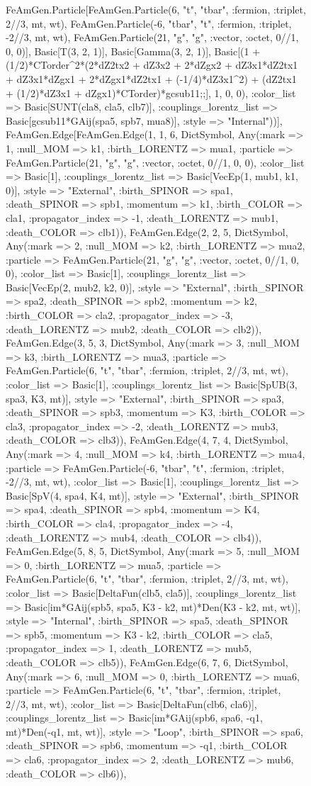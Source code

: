 \documentclass{revtex4}
\begin{document}
\begin{figure}[!htb]
\begin{center}
{FeAmGen.Particle[FeAmGen.Particle(6, "t", "tbar", :fermion, :triplet, 2//3, mt, wt), FeAmGen.Particle(-6, "tbar", "t", :fermion, :triplet, -2//3, mt, wt), FeAmGen.Particle(21, "g", "g", :vector, :octet, 0//1, 0, 0)], Basic[T(3, 2, 1)], Basic[Gamma(3, 2, 1)], Basic[(1 + (1/2)*CTorder^2*(2*dZ2tx2 + dZ3x2 + 2*dZgx2 + dZ3x1*dZ2tx1 + dZ3x1*dZgx1 + 2*dZgx1*dZ2tx1 + (-1/4)*dZ3x1^2) + (dZ2tx1 + (1/2)*dZ3x1 + dZgx1)*CTorder)*gcsub11;;], 1, 0, 0), :color_list => Basic[SUNT(cla8, cla5, clb7)], :couplings_lorentz_list => Basic[gcsub11*GAij(spa5, spb7, mua8)], :style => "Internal"))], FeAmGen.Edge[FeAmGen.Edge(1, 1, 6, Dict{Symbol, Any}(:mark => 1, :null_MOM => k1, :birth_LORENTZ => mua1, :particle => FeAmGen.Particle(21, "g", "g", :vector, :octet, 0//1, 0, 0), :color_list => Basic[1], :couplings_lorentz_list => Basic[VecEp(1, mub1, k1, 0)], :style => "External", :birth_SPINOR => spa1, :death_SPINOR => spb1, :momentum => k1, :birth_COLOR => cla1, :propagator_index => -1, :death_LORENTZ => mub1, :death_COLOR => clb1)), FeAmGen.Edge(2, 2, 5, Dict{Symbol, Any}(:mark => 2, :null_MOM => k2, :birth_LORENTZ => mua2, :particle => FeAmGen.Particle(21, "g", "g", :vector, :octet, 0//1, 0, 0), :color_list => Basic[1], :couplings_lorentz_list => Basic[VecEp(2, mub2, k2, 0)], :style => "External", :birth_SPINOR => spa2, :death_SPINOR => spb2, :momentum => k2, :birth_COLOR => cla2, :propagator_index => -3, :death_LORENTZ => mub2, :death_COLOR => clb2)), FeAmGen.Edge(3, 5, 3, Dict{Symbol, Any}(:mark => 3, :null_MOM => k3, :birth_LORENTZ => mua3, :particle => FeAmGen.Particle(6, "t", "tbar", :fermion, :triplet, 2//3, mt, wt), :color_list => Basic[1], :couplings_lorentz_list => Basic[SpUB(3, spa3, K3, mt)], :style => "External", :birth_SPINOR => spa3, :death_SPINOR => spb3, :momentum => K3, :birth_COLOR => cla3, :propagator_index => -2, :death_LORENTZ => mub3, :death_COLOR => clb3)), FeAmGen.Edge(4, 7, 4, Dict{Symbol, Any}(:mark => 4, :null_MOM => k4, :birth_LORENTZ => mua4, :particle => FeAmGen.Particle(-6, "tbar", "t", :fermion, :triplet, -2//3, mt, wt), :color_list => Basic[1], :couplings_lorentz_list => Basic[SpV(4, spa4, K4, mt)], :style => "External", :birth_SPINOR => spa4, :death_SPINOR => spb4, :momentum => K4, :birth_COLOR => cla4, :propagator_index => -4, :death_LORENTZ => mub4, :death_COLOR => clb4)), FeAmGen.Edge(5, 8, 5, Dict{Symbol, Any}(:mark => 5, :null_MOM => 0, :birth_LORENTZ => mua5, :particle => FeAmGen.Particle(6, "t", "tbar", :fermion, :triplet, 2//3, mt, wt), :color_list => Basic[DeltaFun(clb5, cla5)], :couplings_lorentz_list => Basic[im*GAij(spb5, spa5, K3 - k2, mt)*Den(K3 - k2, mt, wt)], :style => "Internal", :birth_SPINOR => spa5, :death_SPINOR => spb5, :momentum => K3 - k2, :birth_COLOR => cla5, :propagator_index => 1, :death_LORENTZ => mub5, :death_COLOR => clb5)), FeAmGen.Edge(6, 7, 6, Dict{Symbol, Any}(:mark => 6, :null_MOM => 0, :birth_LORENTZ => mua6, :particle => FeAmGen.Particle(6, "t", "tbar", :fermion, :triplet, 2//3, mt, wt), :color_list => Basic[DeltaFun(clb6, cla6)], :couplings_lorentz_list => Basic[im*GAij(spb6, spa6, -q1, mt)*Den(-q1, mt, wt)], :style => "Loop", :birth_SPINOR => spa6, :death_SPINOR => spb6, :momentum => -q1, :birth_COLOR => cla6, :propagator_index => 2, :death_LORENTZ => mub6, :death_COLOR => clb6)), }
\end{center}
\end{figure}
\end{document}
